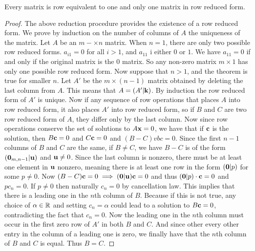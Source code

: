 \documentclass[a4paper]{article}
\begin{document}
\begin{thm}{}{} Every matrix is row equivalent to one and only one matrix in row reduced form. 
\end{thm}
\begin{proof} The above reduction procedure provides the existence of a row reduced form. We prove by induction on the number of columns of $A$ the uniqueness of the matrix. Let $A$ be an $m-\times n$ matrix. When $n=1$, there are only two possible row reduced forms. $a_{i1}=0$ for all $i>1$, and $a_{11}$ i either $0$ or $1$. We have $a_{11}=0$ if and only if the original matrix is the $0$ matrix. So any non-zero matrix $m\times 1$ has only one possible row reduced form. \linebreak\linebreak
Now suppose that $n>1$, and the theorem is true for smaller $n$. Let $A'$ be the $m\times(n-1)$ matrix obtained by deleting the last column from $A$. This means that $A=(A'|\vb{k})$. By induction the row reduced form of $A'$ is unique. Now if any sequence of row operations that places $A$ into row reduced form, it also places $A'$ into row reduced form, so if $B$ and $C$ are two row reduced form of $A$, they differ only by the last column. Now since row operations conserve the set of solutions to $A\vb{x}=0$, we have that if $\vb{c}$ is the solution, then $B\vb{c}=0$ and $C\vb{c}=0$ and $(B-C)vb{c}=0$. Since the first $n-1$ columns of $B$ and $C$ are the same, if $B\neq C$, we have $B-C$ is of the form $(\vb{0}_{m,n-1}|\vb{u})$ and $\vb{u}\neq0$. Since the last column is nonzero, there must be at least one element in $\vb{u}$ nonzero, meaning there is at least one row in the form $(\vb{0}|p)$ for some $p\neq0$. \linebreak\linebreak
Now $(B-C)\vb{c}=0\implies (\vb{0}|\vb{u})\vb{c}=0$ and thus $(\vb{0}|p)\cdot\vb{c}=0$ and $pc_n=0$. If $p\neq 0$ then naturally $c_n=0$ by cancellation law. This implies that there is a leading one in the $n$th column of $B$. Because if this is not true, any choice of $\alpha\in\mathbb{R}$ and setting $c_n=\alpha$ could lead to a solution to $B\vb{c}=0$, contradicting the fact that $c_n=0$. \linebreak\linebreak
Now the leading one in the $n$th column must occur in the first zero row of $A'$ in both $B$ and $C$. And since other every other entry in the column of a leading one is zero, we finally have that the $n$th column of $B$ and $C$ is equal. Thus $B=C$. 
\end{proof}
\end{document}
